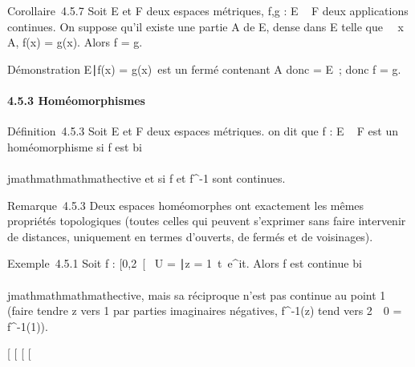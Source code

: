 Corollaire~4.5.7 Soit E et F deux espaces métriques, f,g : E \rightarrow~ F deux
applications continues. On suppose qu'il existe une partie A de E, dense
dans E telle que \forall~~x \in A, f(x) = g(x). Alors f
= g.

Démonstration \x \in E∣f(x) =
g(x)\ est un fermé contenant A donc
\overlineA = E~; donc f = g.

\paragraph{4.5.3 Homéomorphismes}

Définition~4.5.3 Soit E et F deux espaces métriques. on dit que f : E \rightarrow~
F est un homéomorphisme si f est bi\\\\jmathmathmathmathective et si f et f^-1
sont continues.

Remarque~4.5.3 Deux espaces homéomorphes ont exactement les mêmes
propriétés topologiques (toutes celles qui peuvent s'exprimer sans faire
intervenir de distances, uniquement en termes d'ouverts, de fermés et de
voisinages).

Exemple~4.5.1 Soit f : {[}0,2\pi~{[}\rightarrow~ U = \z \in
{}∣\textbar{}z\textbar{} =
1\, t\mapsto~e^it. Alors
f est continue bi\\\\jmathmathmathmathective, mais sa réciproque n'est pas continue au point
1 (faire tendre z vers 1 par parties imaginaires négatives,
f^-1(z) tend vers 2\pi~\neq~0 =
f^-1(1)).

{[}
{[}
{[}
{[}
